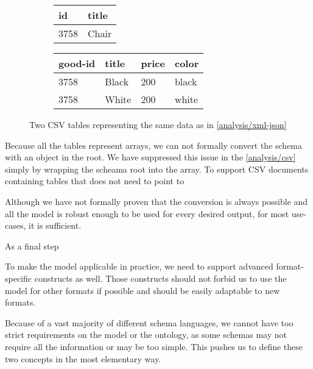 \begin{figure}[h!]\centering
  \begin{subfigure}{.5\textwidth}
    \centering
    \begin{tabular}{ll}\toprule
      id   & title \\ \midrule
      3758 & Chair \\ \bottomrule
    \end{tabular}%
  \end{subfigure}%
  \begin{subfigure}{.5\textwidth}
    \centering
    \begin{tabular}{llll}\toprule
      good-id & title & price & color \\ \midrule
      3758 & Black & 200 & black \\
      3758 & White & 200 & white \\ \bottomrule
    \end{tabular}
  \end{subfigure}
  \caption{Two CSV tables representing the same data as in \autoref{analysis/xml-json}}
  \label{analysis/csv}
\end{figure}

Because all the tables represent arrays, we can not formally convert the schema with an object in the root. We have suppressed this issue in the \autoref{analysis/csv} simply by wrapping the scheama root into the array. To support CSV documents containing tables that does not need to point to

Although we have not formally proven that the conversion is always possible and all the model is robust enough to be used for every desired output, for most use-cases, it is sufficient.

As a final step



\bigskip

To make the model applicable in practice, we need to support advanced format-specific constructs as well. Those constructs should not forbid us to use the model for other formats if possible and should be easily adaptable to new formats.

Because of a vast majority of different schema languages, we cannot have too strict requirements on the model or the ontology, as some schemas may not require all the information or may be too simple. This pushes us to define these two concepts in the most elementary way.

